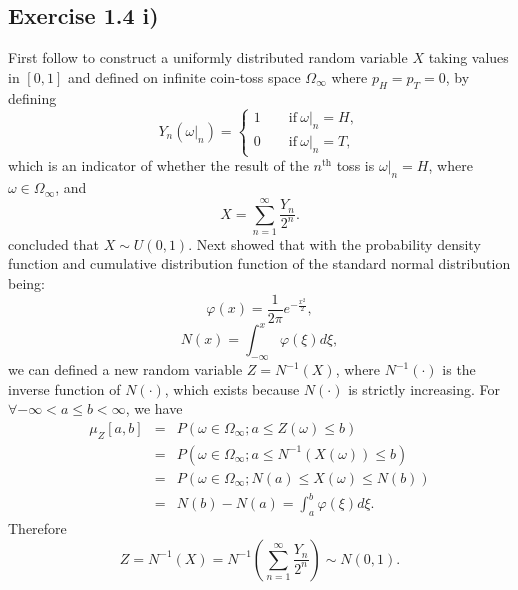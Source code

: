 \documentclass[final,3p,authoryear]{elsarticle}
\begin{document}
	\subsection{Exercise 1.4 i)}
		First follow \cite[Example 1.2.5, p.~11-12]{shreve2004stochastic} to construct a uniformly distributed random variable $X$ taking values in $\left[0,1\right]$ and defined on infinite coin-toss space $\Omega_\infty$ where $p_H=p_T=0$, by defining
		\begin{equation}
			Y_n(\omega|_n)=
			\begin{cases}
				1\qquad \mathrm{if~} \omega|_n=H,\\
				0\qquad \mathrm{if~} \omega|_n=T,
			\end{cases}
		\end{equation}
		which is an indicator of whether the result of the $n^\mathrm{th}$ toss is $\omega|_n=H$, where $\omega \in \Omega_\infty$, and
		\begin{equation}
			X=\sum\limits_{n=1}^{\infty} \frac{Y_n}{2^n}
			.
		\end{equation}
		\cite[Example 1.2.5, p.~11-12]{shreve2004stochastic} concluded that $X\sim U(0,1)$.
		Next \cite[Example 1.2.6, p.~12-13]{shreve2004stochastic} showed that with the probability density function and cumulative distribution function of the standard normal distribution being:
		\begin{equation}
			\varphi(x)=\frac{1}{2\pi} e^{-\frac{x^2}{2}}
			,
		\end{equation}
		\begin{equation}
			N(x)=\int_{-\infty}^{x} \varphi(\xi) d\xi
			,
		\end{equation}
		we can defined a new random variable $Z=N^{-1}(X)$, where $N^{-1}(\cdot)$ is the inverse function of $N(\cdot)$, which exists because $N(\cdot)$ is strictly increasing. For $\forall -\infty < a \leq b < \infty$, we have
		\begin{eqnarray}
			\mu_Z[a,b]&=&P(\omega \in \Omega_\infty; a \leq Z(\omega) \leq b)
			\nonumber\\
			&=&P(\omega \in \Omega_\infty; a \leq N^{-1}(X(\omega)) \leq b)
			\nonumber\\
			&=&P(\omega \in \Omega_\infty; N(a) \leq X(\omega) \leq N(b))
			\nonumber\\
			&=&N(b)-N(a)=\int_{a}^{b} \varphi(\xi) d\xi
			.
		\end{eqnarray}
		Therefore
		\begin{equation}
			Z=N^{-1}(X)=N^{-1}(\sum\limits_{n=1}^{\infty} \frac{Y_n}{2^n}) \sim N(0,1)
			.
		\end{equation}
		
\end{document}
